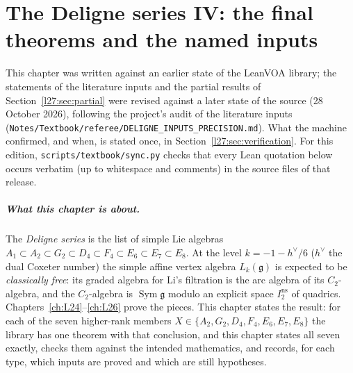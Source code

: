 \chapter[The Deligne series IV: final theorems and named inputs]{The Deligne series IV: the final theorems and the named inputs}\label{ch:L27}
\begingroup\setlength{\emergencystretch}{3em}\sloppy

\providecommand{\ltwentyseveng}{\mathfrak g}
\providecommand{\ltwentysevenIns}{I_2^{\mathrm{ns}}}
\providecommand{\ltwentysevenHilb}{\operatorname{Hilb}}
\providecommand{\ltwentysevenvac}{\mathbf 1}
\providecommand{\ltwentysevenJ}{J_\infty}
\providecommand{\ltwentysevenF}{\mathcal F}
\providecommand{\ltwentysevengr}{\operatorname{gr}}
\providecommand{\ltwentysevendg}{d_{\mathfrak g}}
\ifdefined\conjecture\else\newtheorem{conjecture}[definition]{Conjecture}\fi

This chapter was written against an earlier state of the LeanVOA library; the statements of
the literature inputs and the partial results of Section~\ref{l27:sec:partial} were revised against a later state of the
source (28 October 2026), following the project's audit of the literature inputs
(\texttt{Notes/Textbook/referee/DELIGNE\_INPUTS\_PRECISION.md}). What the machine confirmed, and when, is stated once, in
Section~\ref{l27:sec:verification}. For this edition, \texttt{scripts/textbook/sync.py} checks that every Lean quotation below occurs verbatim (up to whitespace and comments) in the source files of that release.

\paragraph{What this chapter is about.} The \emph{Deligne series} is the list of simple Lie algebras
$A_1\subset A_2\subset G_2\subset D_4\subset F_4\subset E_6\subset E_7\subset E_8$. At the level $k=-1-h^\vee/6$
($h^\vee$ the dual Coxeter number) the simple affine vertex algebra $L_k(\ltwentyseveng)$ is expected to be
\emph{classically free}: its graded algebra for Li's filtration is the arc algebra of its $C_2$-algebra, and the
$C_2$-algebra is $\operatorname{Sym}\ltwentyseveng$ modulo an explicit space $\ltwentysevenIns$ of quadrics.
Chapters~\ref{ch:L24}--\ref{ch:L26} prove the pieces. This chapter states the result: for each of the seven
higher-rank members $X\in\{A_2,G_2,D_4,F_4,E_6,E_7,E_8\}$ the library has one theorem 
with that conclusion, and this chapter states all seven exactly, checks them against the intended mathematics, and
records, for each type, which inputs are proved and which are still hypotheses.

